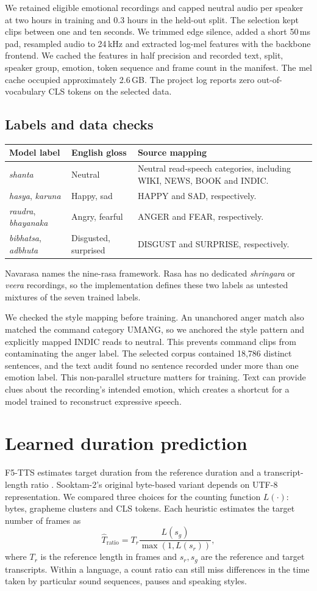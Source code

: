 \documentclass[11pt,a4paper]{article}
\newcommand{\sectionpage}[1]{\clearpage\section{#1}}
\begin{document}
We retained eligible emotional recordings and capped neutral audio per speaker at two hours in training and 0.3 hours in the held-out split. The selection kept clips between one and ten seconds. We trimmed edge silence, added a short 50\,ms pad, resampled audio to 24\,kHz and extracted log-mel features with the backbone frontend. We cached the features in half precision and recorded text, split, speaker group, emotion, token sequence and frame count in the manifest. The mel cache occupied approximately 2.6\,GB. The project log reports zero out-of-vocabulary CLS tokens on the selected data.

\subsection{Labels and data checks}
\begin{tabularx}{\linewidth}{@{}p{28mm}p{30mm}Y@{}}
\toprule
Model label & English gloss & Source mapping \\
\midrule
\emph{shanta} & Neutral & Neutral read-speech categories, including WIKI, NEWS, BOOK and INDIC. \\
\emph{hasya}, \emph{karuna} & Happy, sad & HAPPY and SAD, respectively. \\
\emph{raudra}, \emph{bhayanaka} & Angry, fearful & ANGER and FEAR, respectively. \\
\emph{bibhatsa}, \emph{adbhuta} & Disgusted, surprised & DISGUST and SURPRISE, respectively. \\
\bottomrule
\end{tabularx}

Navarasa names the nine-rasa framework. Rasa has no dedicated \emph{shringara} or \emph{veera} recordings, so the implementation defines these two labels as untested mixtures of the seven trained labels.

We checked the style mapping before training. An unanchored anger match also matched the command category UMANG, so we anchored the style pattern and explicitly mapped INDIC reads to neutral. This prevents command clips from contaminating the anger label. The selected corpus contained 18,786 distinct sentences, and the text audit found no sentence recorded under more than one emotion label. This non-parallel structure matters for training. Text can provide clues about the recording's intended emotion, which creates a shortcut for a model trained to reconstruct expressive speech.

\sectionpage{Learned duration prediction}
F5-TTS estimates target duration from the reference duration and a transcript-length ratio \cite{f5}. Sooktam-2's original byte-based variant depends on UTF-8 representation. We compared three choices for the counting function \(L(\cdot)\): bytes, grapheme clusters and CLS tokens. Each heuristic estimates the target number of frames as
\[
 \widehat{T}_{\mathrm{ratio}}=T_r\frac{L(s_g)}{\max(1,L(s_r))},
\]
where \(T_r\) is the reference length in frames and \(s_r,s_g\) are the reference and target transcripts. Within a language, a count ratio can still miss differences in the time taken by particular sound sequences, pauses and speaking styles.
\end{document}
